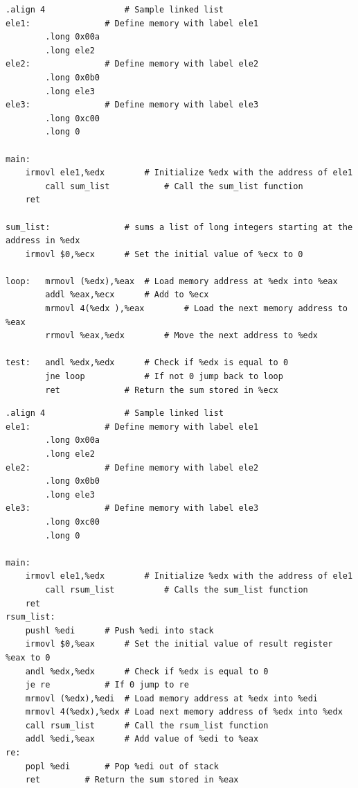 \documentclass{article}
\begin{document}
\begin{lstlisting}[caption={Core Code of sum.ys}, label={cd:sum}]
.align 4				# Sample linked list
ele1:				# Define memory with label ele1
        .long 0x00a
        .long ele2
ele2:				# Define memory with label ele2
        .long 0x0b0
        .long ele3
ele3:				# Define memory with label ele3
        .long 0xc00
        .long 0

main:	
	irmovl ele1,%edx		# Initialize %edx with the address of ele1 	
        call sum_list			# Call the sum_list function
	ret

sum_list:				# sums a list of long integers starting at the address in %edx
	irmovl $0,%ecx		# Set the initial value of %ecx to 0
	
loop:	mrmovl (%edx),%eax	# Load memory address at %edx into %eax 
        addl %eax,%ecx		# Add to %ecx
        mrmovl 4(%edx ),%eax		# Load the next memory address to %eax
        rrmovl %eax,%edx		# Move the next address to %edx 
        
test:   andl %edx,%edx		# Check if %edx is equal to 0
        jne loop			# If not 0 jump back to loop
        ret				# Return the sum stored in %ecx
\end{lstlisting}
\begin{lstlisting}[caption={Core Code of rsum.ys}, label={cd:rsum}]
.align 4				# Sample linked list
ele1:				# Define memory with label ele1
        .long 0x00a
        .long ele2
ele2:				# Define memory with label ele2
        .long 0x0b0
        .long ele3
ele3:				# Define memory with label ele3
        .long 0xc00
        .long 0

main:
	irmovl ele1,%edx		# Initialize %edx with the address of ele1 	
        call rsum_list			# Calls the sum_list function
	ret
rsum_list:
	pushl %edi		# Push %edi into stack
	irmovl $0,%eax		# Set the initial value of result register %eax to 0
	andl %edx,%edx		# Check if %edx is equal to 0
	je re			# If 0 jump to re
	mrmovl (%edx),%edi	# Load memory address at %edx into %edi 
	mrmovl 4(%edx),%edx	# Load next memory address of %edx into %edx
	call rsum_list		# Call the rsum_list function
	addl %edi,%eax		# Add value of %edi to %eax
re:
	popl %edi		# Pop %edi out of stack
	ret			# Return the sum stored in %eax
\end{lstlisting}
\end{document}
